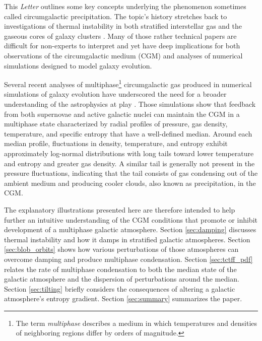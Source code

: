 \documentclass[twocolumn]{aastex63}
\begin{document}
This \textit{Letter} outlines some key concepts underlying the phenomenon sometimes called circumgalactic precipitation.  The topic's history stretches back to investigations of thermal instability in both stratified interstellar gas \citep[e.g.,][]{Spitzer_1956ApJ...124...20S,Field65,Defouw_1970ApJ...160..659D,bnf09} and the gaseous cores of galaxy clusters \cite[e.g.,][]{fn77,MathewsBregman_1978ApJ...224..308M,Cowie_1980MNRAS.191..399C,Nulsen_1986MNRAS.221..377N,Malagoli_1987ApJ...319..632M,bs89,Loewenstein_1989MNRAS.238...15L,McCourt+2012MNRAS.419.3319M,Gaspari+2013MNRAS.432.3401G,ChoudhurySharma_2016MNRAS.457.2554C,Voit_2017_BigPaper,Voit_2018ApJ...868..102V,Choudhury_2019MNRAS.488.3195C}.  Many of those rather technical papers are difficult for non-experts to interpret and yet have deep implications for both observations of the circumgalactic medium (CGM) and analyses of numerical simulations designed to model galaxy evolution.  

Several recent analyses of multiphase\footnote{The term \textit{multiphase} describes a medium in which temperatures and densities of neighboring regions differ by orders of magnitude.} circumgalactic gas produced in numerical simulations of galaxy evolution have underscored the need for a broader understanding of the astrophysics at play \citep[e.g.,][]{Lochhaas_2020MNRAS.493.1461L,Nelson_2020arXiv200509654N,Fielding_2020arXiv200616316F,Esmerian_2020arXiv200613945E}. Those simulations show that feedback from both supernovae and active galactic nuclei can maintain the CGM in a multiphase state characterized by radial profiles of pressure, gas density, temperature, and specific entropy that have a well-defined median.  Around each median profile, fluctuations in density, temperature, and entropy exhibit approximately log-normal distributions with long tails toward lower temperature and entropy and greater gas density.  A similar tail is generally not present in the pressure fluctuations, indicating that the tail consists of gas condensing out of the ambient medium and producing cooler clouds, also known as precipitation, in the CGM.

The explanatory illustrations presented here are therefore intended to help further an intuitive understanding of the CGM conditions that promote or inhibit development of a multiphase galactic atmosphere.  Section \ref{sec:damping} discusses thermal instability and how it damps in stratified galactic atmospheres.  Section \ref{sec:blob_orbits} shows how various perturbations of those atmospheres can overcome damping and produce multiphase condensation.  Section \ref{sec:tctff_pdf} relates the rate of multiphase condensation to both the median state of the galactic atmosphere and the dispersion of perturbations around the median. Section \ref{sec:tilting} briefly considers the consequences of altering a galactic atmosphere's entropy gradient. Section \ref{sec:summary} summarizes the paper.
\end{document}

